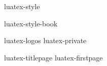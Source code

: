 

%
%
%






\environment luatex-style

\startmode[book]
    \environment luatex-style-book
\stopmode

\environment luatex-logos
\environment luatex-private

\startmode[export]

    \setupbackend
      [export=luatex]

\stopmode

\startdocument
  [status=experimental,
   version=1.09]

\startnotmode[*export]
    \component luatex-titlepage
    \component luatex-firstpage
\stopnotmode

